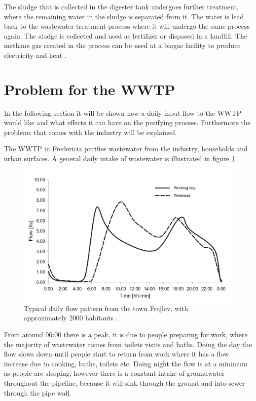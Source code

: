 The sludge that is collected in the digester tank undergoes further treatment, where the remaining water in the sludge is separated from it. The water is lead back to the wastewater treatment process where it will undergo the same process again. The sludge is collected and used as fertilizer or disposed in a landfill. The methane gas created in the process can be used at a biogas facility to produce electricity and heat \cite{wwtp_ekstra}.


\section{Problem for the WWTP}
In the following section it will be shown how a daily input flow to the WWTP would like and what effects it can have on the purifying process. Furthermore the problems that comes with the industry will be explained. 

The WWTP in Fredericia purifies wastewater from the industry, households and urban surfaces. A general daily intake of wastewater is illustrated in figure \ref{fig:input_to_wwtp}  

\begin{figure}[H]
\centering
\includegraphics[width=.6\textwidth]{report/introduction/pictures/poopflow.png}
\caption{Typical daily flow pattern from the town Frejlev, with approximately 2000 habitants \cite{schlutter1999numerical}.}
\label{fig:input_to_wwtp}%
\end{figure} 

From around 06:00 there is a peak, it is due to people preparing for work, where the majority of wastewater comes from toilets visits and baths. Doing the day the flow slows down until people start to return from work where it has a flow increase due to cooking, baths, toilets etc. Doing night the flow is at a minimum as people are sleeping, however there is a constant intake of groundwater throughout the pipeline, because it will sink through the ground and into sewer through the pipe wall.  

